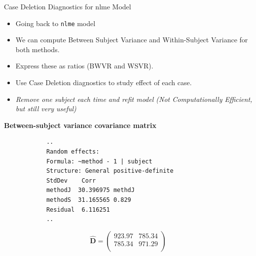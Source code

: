 \documentclass[compress]{beamer}        %
\makeatletter
\newcommand{\tcb}{\textcolor{beamer@blendedblue}}
\makeatother
\begin{document}
\begin{frame}
	\large
	\noindent Case Deletion Diagnostics for nlme Model
	\begin{itemize}
		\item Going back to \texttt{nlme} model
		\item We can compute Between Subject Variance and Within-Subject Variance for both methods. 
		\item Express these as ratios (BWVR and WSVR).
		\item Use Case Deletion diagnostics to study effect of each case.
		\item \textit{Remove one subject each time and refit model \textit{(Not Computationally Efficient, but still very useful)}}
	\end{itemize}
\end{frame}
		\begin{frame}[fragile]{\bf \tcb{Between-subject variance covariance matrix }}
			
			\begin{verbatim}
			..
			Random effects:
			Formula: ~method - 1 | subject
			Structure: General positive-definite
			StdDev    Corr
			methodJ  30.396975 methdJ
			methodS  31.165565 0.829
			Residual  6.116251
			..
			\end{verbatim}
			\[
			\hat{\boldsymbol{D}} = \left(
			\begin{array}{cc}
			923.97	& 785.34 \\
			785.34	& 971.29\\
			\end{array}\right)
			\]
		\end{frame}
		
\end{document}
